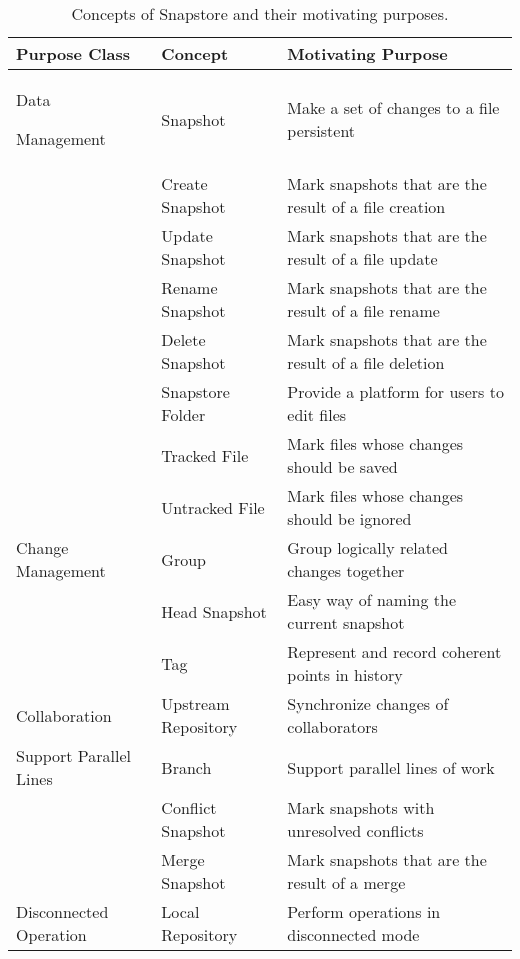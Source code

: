 \begin{table}
\begin{tabular}{ |p{3.5cm}||p{5cm}||p{8cm}|}
 \hline
 \textbf{Purpose Class} & \textbf{Concept} & \textbf{Motivating Purpose}\\[8pt]
 \hline
 \parbox[t]{3cm}{Data \par Management\strut} & Snapshot & Make a set of changes to a file persistent\\[8pt]
  & Create Snapshot & Mark snapshots that are the result of a file creation\\[8pt]
  & Update Snapshot & Mark snapshots that are the result of a file update\\[8pt]
  & Rename Snapshot & Mark snapshots that are the result of a file rename\\[8pt]
  & Delete Snapshot & Mark snapshots that are the result of a file deletion\\[8pt]
  & Snapstore Folder & Provide a platform for users to edit files\\[8pt]
  & Tracked File & Mark files whose changes should be saved\\[8pt]
  & Untracked File & Mark files whose changes should be ignored\\[8pt]
 \hline
 Change Management & Group & Group logically related changes together\\[8pt]
  & Head Snapshot & Easy way of naming the current snapshot\\[8pt]
  & Tag & Represent and record coherent points in history\\[8pt]
 \hline
 Collaboration & Upstream Repository & Synchronize changes of collaborators\\[8pt]
 \hline
 Support Parallel Lines & Branch & Support parallel lines of work\\[8pt]
  & Conflict Snapshot & Mark snapshots with unresolved conflicts\\[8pt]
  & Merge Snapshot & Mark snapshots that are the result of a merge\\[8pt]
 \hline
 Disconnected Operation & Local Repository & Perform operations in disconnected mode\\[8pt]
 \hline
\end{tabular}
\caption{Concepts of Snapstore and their motivating purposes.}
\end{table}

